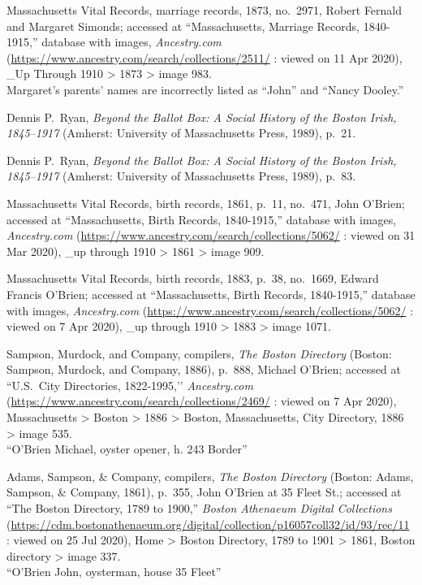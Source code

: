 \begin{thebibliography}{999}
Massachusetts Vital Records, marriage records, 1873, no.\ 2971, Robert Fernald and Margaret Simonds; accessed at ``Massachusetts, Marriage Records, 1840-1915,'' database with images, \textit{Ancestry.com} (\url{https://www.ancestry.com/search/collections/2511/} : viewed on 11 Apr 2020), \_Up Through 1910 > 1873 > image 983.\\
Margaret's parents' names are incorrectly listed as ``John'' and ``Nancy Dooley.''

Dennis P.\ Ryan, \textit{Beyond the Ballot Box: A Social History of the Boston Irish, 1845--1917} (Amherst: University of Massachusetts Press, 1989), p.\ 21.

Dennis P.\ Ryan, \textit{Beyond the Ballot Box: A Social History of the Boston Irish, 1845--1917} (Amherst: University of Massachusetts Press, 1989), p.\ 83.

Massachusetts Vital Records, birth records, 1861, p.\ 11, no.\ 471, John O'Brien; accessed at ``Massachusetts, Birth Records, 1840-1915,'' database with images, \textit{Ancestry.com} (\url{https://www.ancestry.com/search/collections/5062/} : viewed on 31 Mar 2020), \_up through 1910 > 1861 > image 909.

Massachusetts Vital Records, birth records, 1883, p.\ 38, no.\ 1669, Edward Francis O'Brien; accessed at ``Massachusetts, Birth Records, 1840-1915,'' database with images, \textit{Ancestry.com} (\url{https://www.ancestry.com/search/collections/5062/} : viewed on 7 Apr 2020), \_up through 1910 > 1883 > image 1071.

Sampson, Murdock, and Company, compilers, \textit{The Boston Directory} (Boston: Sampson, Murdock, and Company, 1886), p.\ 888, Michael O'Brien; accessed at ``U.S.\ City Directories, 1822-1995,’’ \textit{Ancestry.com} (\url{https://www.ancestry.com/search/collections/2469/} : viewed on 7 Apr 2020), Massachusetts > Boston > 1886 > Boston, Massachusetts, City Directory, 1886 > image 535.\\
``O'Brien Michael, oyster opener, h. 243 Border''

Adams, Sampson, \& Company, compilers, \textit{The Boston Directory} (Boston: Adams, Sampson, \& Company, 1861), p.\ 355, John O'Brien at 35 Fleet St.; accessed at ``The Boston Directory, 1789 to 1900,'' \textit{Boston Athenaeum Digital Collections} (\url{https://cdm.bostonathenaeum.org/digital/collection/p16057coll32/id/93/rec/11} : viewed on 25 Jul 2020), Home > Boston Directory, 1789 to 1901 > 1861, Boston directory > image 337.\\
``O'Brien John, oysterman, house 35 Fleet''


\end{thebibliography}
